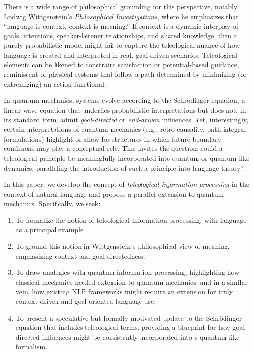 \documentclass[11pt]{article}
\begin{document}
There is a wide range of philosophical grounding for this perspective, notably Ludwig Wittgenstein's \emph{Philosophical Investigations}, where he emphasizes that ``language is context, context is meaning.'' If context is a dynamic interplay of goals, intentions, speaker-listener relationships, and shared knowledge, then a purely probabilistic model might fail to capture the teleological nuance of how language is created and interpreted in real, goal-driven scenarios. Teleological elements can be likened to constraint satisfaction or potential-based guidance, reminiscent of physical systems that follow a path determined by minimizing (or extremizing) an action functional. 

In quantum mechanics, systems evolve according to the Schr\"odinger equation, a linear wave equation that underlies probabilistic interpretations but does not, in its standard form, admit \emph{goal-directed} or \emph{end-driven} influences. Yet, interestingly, certain interpretations of quantum mechanics (e.g., retro-causality, path integral formulations) highlight or allow for structures in which future boundary conditions may play a conceptual role. This invites the question: could a teleological principle be meaningfully incorporated into quantum or quantum-like dynamics, paralleling the introduction of such a principle into language theory?

In this paper, we develop the concept of \emph{teleological information processing} in the context of natural language and propose a parallel extension to quantum mechanics. Specifically, we seek:
\begin{enumerate}
    \item To formalize the notion of teleological information processing, with language as a principal example.
    \item To ground this notion in Wittgenstein’s philosophical view of meaning, emphasizing context and goal-directedness.
    \item To draw analogies with quantum information processing, highlighting how classical mechanics needed extension to quantum mechanics, and in a similar vein, how existing NLP frameworks might require an extension for truly context-driven and goal-oriented language use.
    \item To present a speculative but formally motivated update to the Schr\"odinger equation that includes teleological terms, providing a blueprint for how goal-directed influences might be consistently incorporated into a quantum-like formalism.
\end{enumerate}
\end{document}
